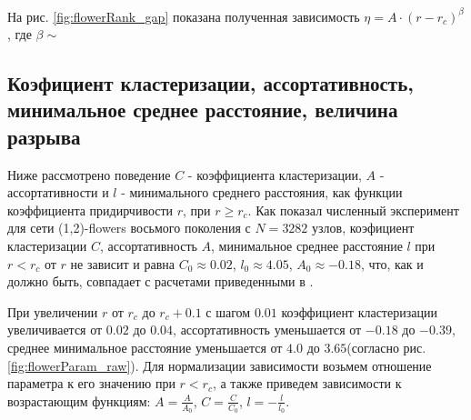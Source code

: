 \documentclass[10pt,aps,pra]{revtex4-1}
\begin{document}
На рис. \ref{fig:flowerRank_gap} показана полученная зависимость $\eta = A \cdot {(r-r_c)}^\beta$, где $\beta \sim $

\subsection{Коэфициент кластеризации, ассортативность, минимальное среднее расстояние, величина разрыва}
Ниже рассмотрено поведение $C$ - коэффициента кластеризации, $A$ - ассортативности и $l$ - минимального среднего расстояния, как функции коэффициента придирчивости $r$, при $r \geq r_c$. Как показал численный эксперимент для сети (1,2)-flowers восьмого поколения с $N=3282$ узлов, коэфициент кластеризации $C$, ассортативность $A$, минимальное среднее расстояние $l$ при $r<r_c$ от $r$ не зависит и равна $C_0 \approx 0.02$, $l_0 \approx 4.05$, $A_0 \approx -0.18$, что, как и должно быть, совпадает с расчетами приведенными в \cite{Rozenfeld1,Rozenfeld2}. 

При увеличении $r$ от $r_c$ до $r_c + 0.1$ с шагом $0.01$ коэффициент кластеризации увеличивается от $0.02$ до $0.04$, ассортативность уменьшается от $-0.18$ до $-0.39$, среднее минимальное расстояние уменьшается от $4.0$ до $3.65$(согласно рис. \ref{fig:flowerParam_raw}). Для нормализации зависимости возьмем отношение параметра к его значению при $r<r_c$, а также приведем зависимости к возрастающим функциям: $A=\frac{A}{A_0}$, $C=\frac{C}{C_0}$, $l=-\frac{l}{l_0}$.
\end{document}
